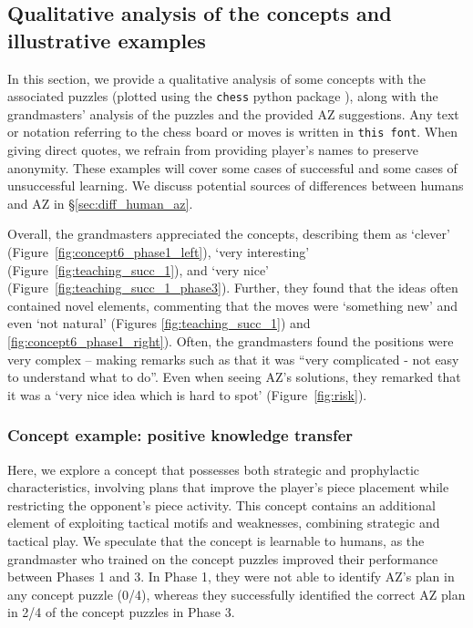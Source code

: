 \documentclass{article}
\newcommand{\ct}[1]{\texttt{#1}}
\begin{document}
\subsection{Qualitative analysis of the concepts and illustrative examples}
In this section, we provide a qualitative analysis of some concepts with the associated puzzles (plotted using the \texttt{chess} python package \citep{chesspackage}), along with the grandmasters' analysis of the puzzles and the provided AZ suggestions. Any text or notation referring to the chess board or moves is written in \ct{this font}. When giving direct quotes, we refrain from providing player's names to preserve anonymity. These examples will cover some cases of successful and some cases of unsuccessful learning. We discuss potential sources of differences between humans and AZ in \S\ref{sec:diff_human_az}.

Overall, the grandmasters appreciated the concepts, describing them as `clever' (Figure~\ref{fig:concept6_phase1_left}), `very interesting' (Figure~\ref{fig:teaching_succ_1}), and `very nice' (Figure~\ref{fig:teaching_succ_1_phase3}). 
Further, they found that the ideas often contained novel elements,
commenting that the moves were `something new' and even `not natural' (Figures \ref{fig:teaching_succ_1}) and \ref{fig:concept6_phase1_right}). 
Often, the grandmasters found the positions were very complex -- making remarks such as that it was ``very complicated - not easy to understand what to do''. Even when seeing AZ's solutions, they remarked that it was a `very nice idea which is hard to spot' (Figure~\ref{fig:risk}).

\subsubsection{Concept example: positive knowledge transfer}

Here, we explore a concept that possesses both strategic and prophylactic characteristics, involving plans that improve the player's piece placement while restricting the opponent's piece activity. This concept contains an additional element of exploiting tactical motifs and weaknesses, combining strategic and tactical play. We speculate that the concept is learnable to humans, as the grandmaster who trained on the concept puzzles improved their performance between Phases 1 and 3. In Phase 1, they were not able to identify AZ's plan in any concept puzzle (0/4), whereas they successfully identified the correct AZ plan in 2/4 of the concept puzzles in Phase 3. 
\end{document}
